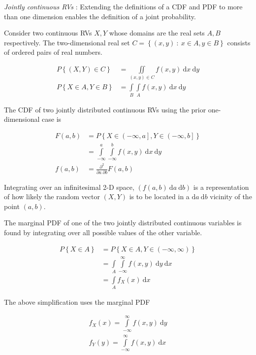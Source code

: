 \textit{Jointly continuous RVs} : Extending the definitions of a CDF and PDF to more than one dimension enables the definition of a joint probability.

Consider two continuous RVs $ X, Y $ whose domains are the real sets $ A, B $ respectively. The two-dimensional real set $ C = \left\{ (x,y) \ :\ x \in A, y \in B  \right\} $ consists of ordered pairs of real numbers.

\begin{align}
	P \left\{ (X, Y) \in C \right\} &= \iint\limits_{(x, y) \in C} f(x,y)\ \mathrm{d}x \  \mathrm{d}y \\
	P \left\{ X \in A, Y \in B \right\} &= \int\limits_{B} \int\limits_{A} f(x,y)\ \mathrm{d}x \  \mathrm{d}y
\end{align}

The CDF of two jointly distributed continuous RVs using the prior one-dimensional case is

\begin{align}
	F(a, b) &= P \left\{ X \in \left( -\infty, a \right],  Y \in \left( -\infty, b \right] \right\} \nonumber \\
	&= \int\limits_{-\infty}^{a} \int\limits_{-\infty}^{b} f(x,y)\ \mathrm{d}x \  \mathrm{d}y \\
	f(a, b) &= \frac{\partial^2}{\partial a\  \partial b} F(a, b)
\end{align}

Integrating over an infinitesimal 2-D space, $ ( f(a, b)\ \mathrm{d}a \ \mathrm{d}b )$ is a representation of how likely the random vector $ (X, Y) $ is to be located in a $ \mathrm{d}a \ \mathrm{d}b $ vicinity of the point $ (a, b) $.

The marginal PDF of one of the two jointly distributed continuous variables is found by integrating over all possible values of the other variable.

\begin{align}
	P \left\{ X \in A \right\} &= P \left\{ X \in A, Y \in \left( -\infty, \infty \right) \right\} \nonumber \\
	&= \int\limits_{A} \int\limits_{-\infty}^{\infty} f(x,y)\ \mathrm{d}y \  \mathrm{d}x \nonumber \\
	&= \int\limits_{A} f_X (x)\ \mathrm{d}x
\end{align}

The above simplification uses the marginal PDF 

\begin{align}
	f_X (x) = \int\limits_{-\infty}^{\infty} f(x,y)\ \mathrm{d}y \\
	f_Y (y) = \int\limits_{-\infty}^{\infty} f(x,y)\ \mathrm{d}x
\end{align}


